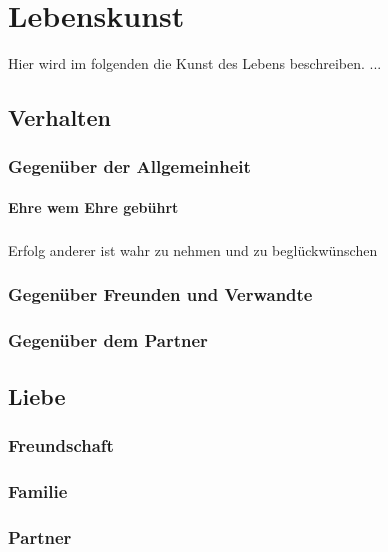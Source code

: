 \chapter{Lebenskunst} 
    \begin{thesis_quotation}
    \end{thesis_quotation}
    
    Hier wird im folgenden die Kunst des Lebens beschreiben. ...
      
    \section{Verhalten}
        \subsection{Gegenüber der Allgemeinheit}
            \subsubsection{Ehre wem Ehre gebührt}
                \paragraph{} Erfolg anderer ist wahr zu nehmen und zu beglückwünschen
        \subsection{Gegenüber Freunden und Verwandte}        
        \subsection{Gegenüber dem Partner}
    \section{Liebe}
    \subsection{Freundschaft}
        \subsection{Familie}
        \subsection{Partner}
            
    
